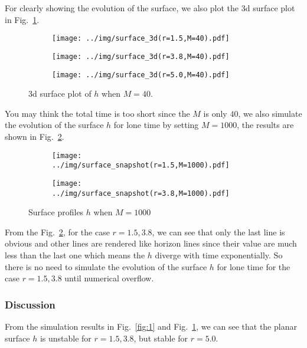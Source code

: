 \documentclass[runningheads]{llncs}
\begin{document}
For clearly showing the evolution of the surface, we also plot the 3d surface plot in Fig.~\ref{fig:2}.

\begin{figure}[!htbp]
    \centering
    \begin{subfigure}{.4\textwidth}
        \centering
        \texttt{[image: ../img/surface\_3d(r=1.5,M=40).pdf]}  
    \end{subfigure}
    \begin{subfigure}{.4\textwidth}
        \centering
        \texttt{[image: ../img/surface\_3d(r=3.8,M=40).pdf]}  
    \end{subfigure}
    \begin{subfigure}{.4\textwidth}
        \centering
        \texttt{[image: ../img/surface\_3d(r=5.0,M=40).pdf]}  
    \end{subfigure}
    \caption{3d surface plot of $h$ when $M=40$.}
    \label{fig:2}
\end{figure}

You may think the total time is too short since the $M$ is only $40$, 
we also simulate the evolution of the surface $h$ for lone time by setting $M=1000$, the results are shown in Fig.~\ref{fig:3}.

\begin{figure}[!htbp]
    \centering
    \begin{subfigure}{.4\textwidth}
        \centering
        \texttt{[image: ../img/surface\_snapshot(r=1.5,M=1000).pdf]}  
    \end{subfigure}
    \begin{subfigure}{.4\textwidth}
        \centering
        \texttt{[image: ../img/surface\_snapshot(r=3.8,M=1000).pdf]}  
    \end{subfigure}
    \caption{Surface profiles $h$ when $M=1000$}
    \label{fig:3}
\end{figure}
From the Fig.~\ref{fig:3}, for the case $r=1.5,3.8$, we can see that only the last line is obvious 
and other lines are rendered like horizon lines since their value are much less than the last one which means the $h$ diverge with time exponentially.
So there is no need to simulate the evolution of the surface $h$ for lone time for the case $r=1.5,3.8$ until numerical overflow.

\subsubsection{Discussion}
From the simulation results in Fig.~\ref{fig:1} and Fig.~\ref{fig:2}, we can see that the planar surface $h$ is unstable for $r=1.5,3.8$, but stable for $r=5.0$.
\end{document}

